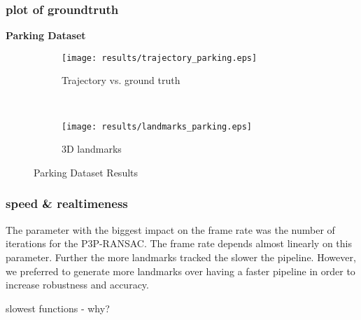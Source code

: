 \subsubsection{plot of groundtruth}
\textbf{Parking Dataset}
\begin{figure*}[ht!]
    \centering
    \begin{subfigure}[t]{0.5\textwidth}
        \centering
        \texttt{[image: results/trajectory\_parking.eps]}
        \caption{Trajectory vs. ground truth}
    \end{subfigure}%
    ~ 
    \begin{subfigure}[t]{0.5\textwidth}
        \centering
        \texttt{[image: results/landmarks\_parking.eps]}
        \caption{3D landmarks}
    \end{subfigure}
    \caption{Parking Dataset Results}
		\label{parking_result_fig}
\end{figure*}

\subsubsection{speed \& realtimeness}
The parameter with the biggest impact on the frame rate was the number of iterations for the P3P-RANSAC. The frame rate depends almost linearly on this parameter. Further the more landmarks tracked the slower the pipeline. However, we preferred to generate more landmarks over having a faster pipeline in order to increase robustness and accuracy.

slowest functions - why?

